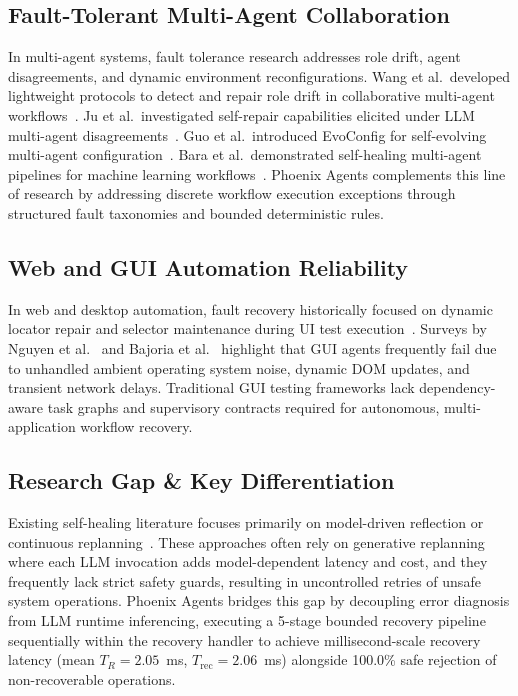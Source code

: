 \documentclass[conference]{IEEEtran}
\newcommand{\chg}[1]{{\color{blue}#1}}
\begin{document}
\subsection{Fault-Tolerant Multi-Agent Collaboration}
In multi-agent systems, fault tolerance research addresses role drift, agent disagreements, and dynamic environment reconfigurations. Wang et al.\ developed lightweight protocols to detect and repair role drift in collaborative multi-agent workflows~\cite{wang2026}. Ju et al.\ investigated self-repair capabilities elicited under LLM multi-agent disagreements~\cite{ju2025}. Guo et al.\ introduced EvoConfig for self-evolving multi-agent configuration~\cite{guo2026}. Bara et al.\ demonstrated self-healing multi-agent pipelines for machine learning workflows~\cite{bara2026}. Phoenix Agents complements this line of research by addressing discrete workflow execution exceptions through structured fault taxonomies and bounded deterministic rules.

\subsection{Web and GUI Automation Reliability}
In web and desktop automation, fault recovery historically focused on dynamic locator repair and selector maintenance during UI test execution~\cite{garcia2026}. Surveys by Nguyen et al.~\cite{nguyen2025} and Bajoria et al.~\cite{bajoria2026} highlight that GUI agents frequently fail due to unhandled ambient operating system noise, dynamic DOM updates, and transient network delays. Traditional GUI testing frameworks lack dependency-aware task graphs and supervisory contracts required for autonomous, multi-application workflow recovery.

\subsection{Research Gap \& Key Differentiation}
Existing self-healing literature focuses primarily on model-driven reflection or continuous replanning~\cite{babu2026,jeong2026,patel2026a}. These approaches often rely on generative replanning where each LLM invocation adds model-dependent latency and cost, and they frequently lack strict safety guards, resulting in uncontrolled retries of unsafe system operations. Phoenix Agents bridges this gap by decoupling error diagnosis from LLM runtime inferencing, executing a 5-stage bounded recovery pipeline sequentially within the recovery handler to achieve millisecond-scale \chg{recovery latency (mean $T_R = 2.05$~ms, $T_{\text{rec}} = 2.06$~ms) alongside 100.0\% safe rejection of non-recoverable operations.}
\end{document}
